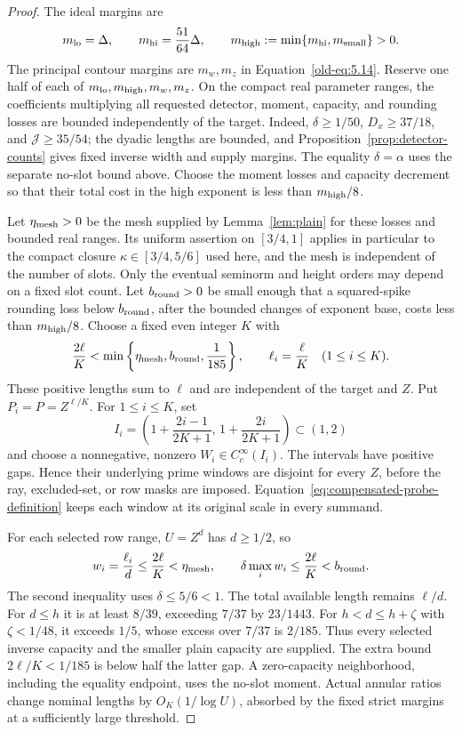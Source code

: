 \begin{proof}
The ideal margins are
\[
 m_{\rm lo}=\Delta,\qquad m_{\rm hi}=\frac{51}{64}\Delta,\qquad
 m_{\rm high}:=\min\{m_{\rm hi},m_{\rm small}\}>0.
\]
The principal contour margins are \(m_w,m_z\) in
Equation~\eqref{old-eq:5.14}.  Reserve one half of each of
\(m_{\rm lo},m_{\rm high},m_w,m_z\).  On the compact real parameter
ranges, the coefficients multiplying all requested detector, moment,
capacity, and rounding losses are bounded independently of the target.
Indeed, \(\delta\ge1/50\), \(D_x\ge37/18\), and
\(\mathcal J\ge35/54\); the dyadic lengths are bounded, and
Proposition~\ref{prop:detector-counts} gives fixed inverse width and
supply margins.  The equality \(\delta=\alpha\) uses the separate
no-slot bound above.  Choose the moment losses and capacity decrement
so that their total cost in the high exponent is less than
\(m_{\rm high}/8\).

Let \(\eta_{\rm mesh}>0\) be the mesh supplied by
Lemma~\ref{lem:plain} for these losses and bounded real ranges.  Its
uniform assertion on \([3/4,1]\) applies in particular to the compact
closure \(\kappa\in[3/4,5/6]\) used here, and the mesh is independent
of the number of slots.  Only the eventual seminorm and height orders
may depend on a fixed slot count.  Let \(b_{\rm round}>0\) be small
enough that a squared-spike rounding loss below \(b_{\rm round}\), after
the bounded changes of exponent base, costs less than \(m_{\rm high}/8\).
Choose a fixed even integer \(K\) with
\[
 \frac{2\ell}{K}<
 \min\left\{\eta_{\rm mesh},b_{\rm round},\frac1{185}\right\},
 \qquad \ell_i=\frac{\ell}{K}\quad(1\le i\le K).
\]
These positive lengths sum to \(\ell\) and are independent of the
target and \(Z\).  Put \(P_i=P=Z^{\ell/K}\).  For \(1\le i\le K\), set
\[
 I_i=\left(1+\frac{2i-1}{2K+1},\,1+\frac{2i}{2K+1}\right)\subset(1,2)
\]
and choose a nonnegative, nonzero \(W_i\in C_c^\infty(I_i)\).
The intervals have positive gaps.  Hence their underlying prime windows
are disjoint for every \(Z\), before the ray, excluded-set, or row masks
are imposed.  Equation~\eqref{eq:compensated-probe-definition} keeps each
window at its original scale in every summand.

For each selected row range, \(U=Z^d\) has \(d\ge1/2\), so
\[
 w_i=\frac{\ell_i}{d}\le\frac{2\ell}{K}<\eta_{\rm mesh},
 \qquad
 \delta\max_iw_i\le\frac{2\ell}{K}<b_{\rm round}.
\]
The second inequality uses \(\delta\le5/6<1\).  The total available
length remains \(\ell/d\).  For \(d\le h\) it is at least \(8/39\),
exceeding \(7/37\) by \(23/1443\).  For \(h<d\le h+\zeta\) with
\(\zeta<1/48\), it exceeds \(1/5\), whose excess over \(7/37\) is
\(2/185\).  Thus every selected inverse capacity and the smaller
plain capacity are supplied.  The extra bound \(2\ell/K<1/185\)
is below half the latter gap.  A zero-capacity neighborhood, including
the equality endpoint, uses the no-slot moment.  Actual annular ratios
change nominal lengths by \(O_K(1/\log U)\), absorbed by the fixed
strict margins at a sufficiently large threshold.


\end{proof}
